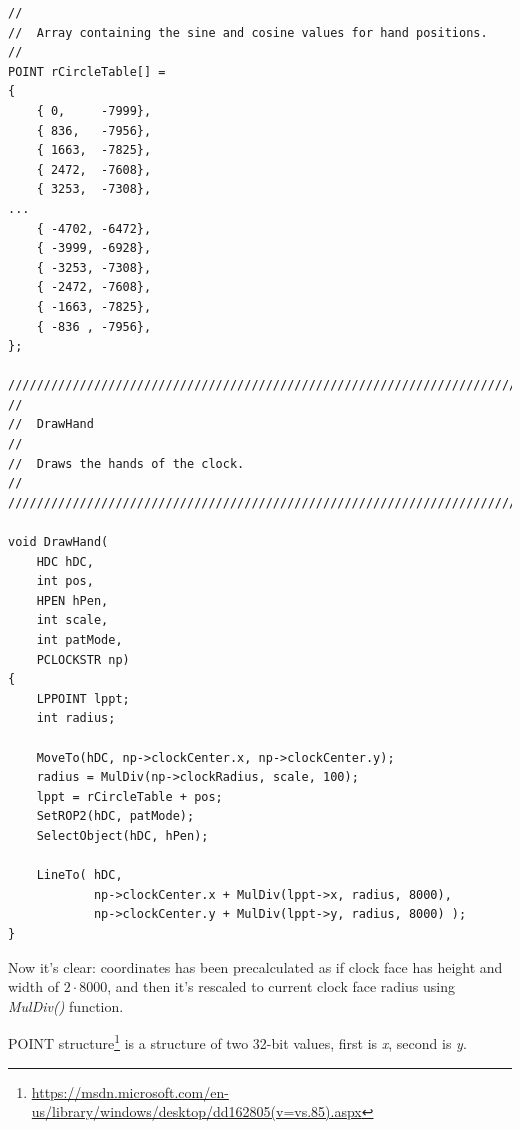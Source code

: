 \begin{lstlisting}[style=customc]
//
//  Array containing the sine and cosine values for hand positions.
//
POINT rCircleTable[] =
{
    { 0,     -7999},
    { 836,   -7956},
    { 1663,  -7825},
    { 2472,  -7608},
    { 3253,  -7308},
...
    { -4702, -6472},
    { -3999, -6928},
    { -3253, -7308},
    { -2472, -7608},
    { -1663, -7825},
    { -836 , -7956},
};

////////////////////////////////////////////////////////////////////////////
//
//  DrawHand
//
//  Draws the hands of the clock.
//
////////////////////////////////////////////////////////////////////////////

void DrawHand(
    HDC hDC,
    int pos,
    HPEN hPen,
    int scale,
    int patMode,
    PCLOCKSTR np)
{
    LPPOINT lppt;
    int radius;

    MoveTo(hDC, np->clockCenter.x, np->clockCenter.y);
    radius = MulDiv(np->clockRadius, scale, 100);
    lppt = rCircleTable + pos;
    SetROP2(hDC, patMode);
    SelectObject(hDC, hPen);

    LineTo( hDC,
            np->clockCenter.x + MulDiv(lppt->x, radius, 8000),
            np->clockCenter.y + MulDiv(lppt->y, radius, 8000) );
}
\end{lstlisting}

Now it's clear: coordinates has been precalculated as if clock face has height and width of $2 \cdot 8000$,
and then it's rescaled to current clock face radius using \emph{MulDiv()} function.

POINT structure\footnote{\url{https://msdn.microsoft.com/en-us/library/windows/desktop/dd162805(v=vs.85).aspx}}
is a structure of two 32-bit values, first is \emph{x}, second is \emph{y}.

